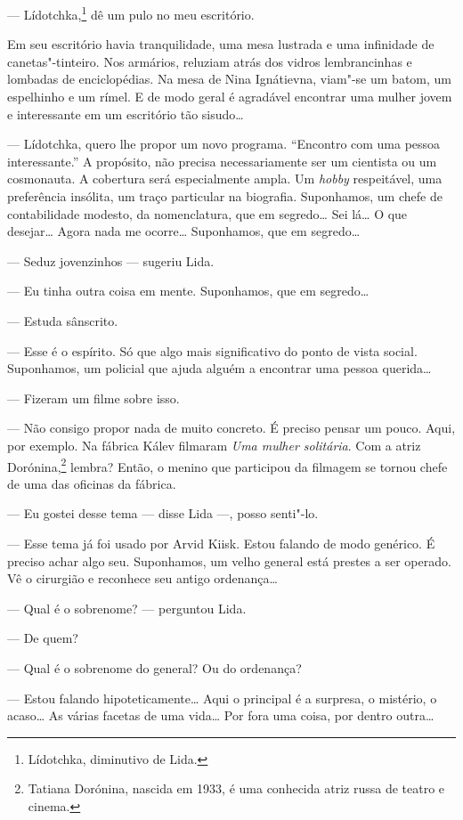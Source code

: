 --- Lídotchka,\footnote{Lídotchka, diminutivo de Lida.} dê um pulo no
meu escritório.

Em seu escritório havia tranquilidade, uma mesa lustrada e uma
infinidade de canetas"-tinteiro. Nos armários, reluziam atrás dos vidros
lembrancinhas e lombadas de enciclopédias. Na mesa de Nina Ignátievna,
viam"-se um batom, um espelhinho e um rímel. E de modo geral é agradável
encontrar uma mulher jovem e interessante em um escritório tão sisudo\ldots{}

--- Lídotchka, quero lhe propor um novo programa. ``Encontro com uma
pessoa interessante.'' A propósito, não precisa necessariamente ser um
cientista ou um cosmonauta. A cobertura será especialmente ampla. Um
\emph{hobby} respeitável, uma preferência insólita, um traço particular
na biografia. Suponhamos, um chefe de contabilidade modesto, da
nomenclatura, que em segredo\ldots{} Sei lá\ldots{} O que desejar\ldots{} Agora nada me
ocorre\ldots{} Suponhamos, que em segredo\ldots{}

--- Seduz jovenzinhos --- sugeriu Lida.

--- Eu tinha outra coisa em mente. Suponhamos, que em segredo\ldots{}

--- Estuda sânscrito.

--- Esse é o espírito. Só que algo mais significativo do ponto de vista
social. Suponhamos, um policial que ajuda alguém a encontrar uma pessoa
querida\ldots{}

--- Fizeram um filme sobre isso.

--- Não consigo propor nada de muito concreto. É preciso pensar um
pouco. Aqui, por exemplo. Na fábrica Kálev filmaram \emph{Uma mulher
solitária}. Com a atriz Dorónina,\footnote{Tatiana Dorónina, nascida em
  1933, é uma conhecida atriz russa de teatro e cinema.} lembra? Então,
o menino que participou da filmagem se tornou chefe de uma das oficinas
da fábrica.

--- Eu gostei desse tema --- disse Lida ---, posso senti"-lo.

--- Esse tema já foi usado por Arvid Kiisk. Estou falando de modo
genérico. É preciso achar algo seu. Suponhamos, um velho general está
prestes a ser operado. Vê o cirurgião e reconhece seu antigo
ordenança\ldots{}

--- Qual é o sobrenome? --- perguntou Lida.

--- De quem?

--- Qual é o sobrenome do general? Ou do ordenança?

--- Estou falando hipoteticamente\ldots{} Aqui o principal é a surpresa, o
mistério, o acaso\ldots{} As várias facetas de uma vida\ldots{} Por fora uma
coisa, por dentro outra\ldots{}

